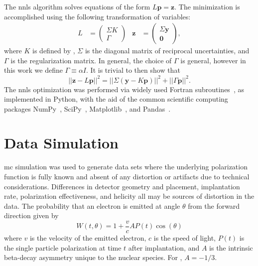 The \gls{nnls} algorithm solves equations of the form $L\mathbf{p} = \mathbf{z}$. The minimization  is accomplished using the following transformation of variables: 
%
\begin{align}
    L &= 
    \left(\begin{array}{c}
        \Sigma K \\ \Gamma
    \end{array}\right) &
    \mathbf{z} &= \left(\begin{array}{c}
        \Sigma\mathbf{y} \\ \bm{0}
    \end{array}\right),
\end{align}
%
where $K$ is defined by , $\Sigma$ is the diagonal matrix of reciprocal uncertainties, and $\Gamma$ is the regularization matrix. In general, the choice of $\Gamma$ is general, however in this work we define $\Gamma \equiv \alpha I$. It is trivial to then show that 
%
\begin{equation}
||\mathbf{z}-L\mathbf{p}||^2 = ||\Sigma (\mathbf{y} - K\mathbf{p})||^2 + ||\Gamma\mathbf{p}||^2.
\end{equation}
%
The \gls{nnls} optimization was performed via widely used Fortran subroutines~\cite{1995-Lawson-SLSP}, as implemented in Python, with the aid of the common scientific computing packages NumPy~\cite{2011-vanderWalt-CSE-13-22}, SciPy~\cite{2020-Virtanen-NM}, Matplotlib~\cite{2007-Hunter-CSE-9-90}, and Pandas~\cite{McKinney2010}.


\section{ Data Simulation \label{sec:datasim}}

\Gls{mc} simulation was used to generate data sets where the underlying polarization function is fully known and absent of any distortion or artifacts due to technical considerations. Differences in detector geometry and placement, implantation rate, polarization effectiveness, and helicity all may be sources of distortion in the data. The probability that an electron is emitted at angle $\theta$ from the forward direction given by\cite{Correll1983}
%
\begin{equation}\label{eq:decay_direction}
W(t,\theta) = 1 + \frac{v}{c}AP(t)\cos(\theta)
\end{equation}
%
where $v$ is the velocity of the emitted electron, $c$ is the speed of light, $P(t)$ is the single particle polarization at time $t$ after implantation, and $A$ is the intrinsic beta-decay asymmetry unique to the nuclear species. For , $A = -1/3$\cite{Arnold1988}. 

